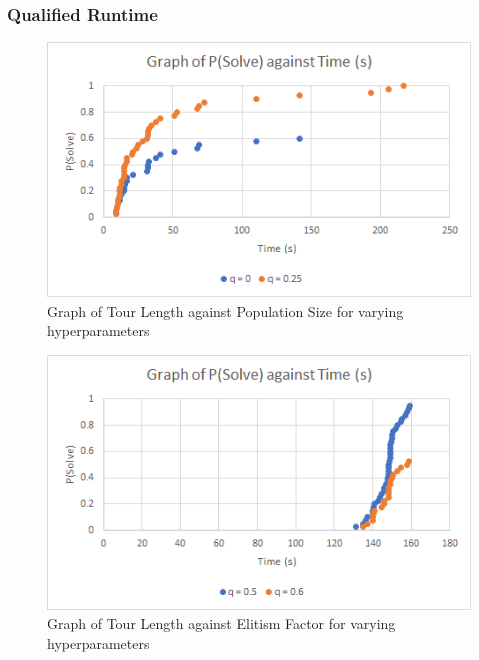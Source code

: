 \documentclass[sigconf]{acmart}
\begin{document}
\subsubsection{Qualified Runtime}
\begin{figure}[h]
  \centering
  \includegraphics[width=\linewidth=]{genetic_qrtd_Atlanta.png}
  \caption{Graph of Tour Length against Population Size for varying hyperparameters}
\end{figure}
\begin{figure}[h]
  \centering
  \includegraphics[width=\linewidth]{genetic_qrtd_NYC.png}
  \caption{Graph of Tour Length against Elitism Factor for varying hyperparameters}
\end{figure}
\end{document}
